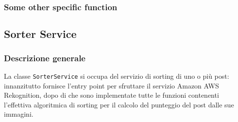 \subsubsection{Some other specific function}

\subsection{Sorter Service}
\subsubsection{Descrizione generale}
La classe \verb+SorterService+  si occupa
del servizio di sorting di uno o più post: innanzitutto fornisce l'entry point per sfruttare 
il servizio Amazon AWS Rekognition, dopo di che sono implementate tutte le funzioni contenenti l'effettiva algoritmica di sorting per il calcolo del punteggio del post dalle sue immagini.

